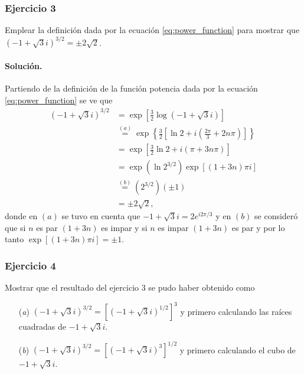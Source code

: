 \documentclass[a4paper]{report}
\begin{document}
\subsubsection{Ejercicio 3}

Emplear la definición dada por la ecuación \ref{eq:power_function} para mostrar que \((-1+\sqrt{3}i)^{3/2}=\pm2\sqrt{2}\).

\paragraph{Solución.} Partiendo de la definición de la función potencia dada por la ecuación \ref{eq:power_function} se ve que 
\begin{align*}
 (-1+\sqrt{3}i)^{3/2}&=\exp\left[\frac{3}{2}\log(-1+\sqrt{3}i)\right]\\
  &\overset{(a)}{=}\exp\left\{\frac{3}{2}\left[\ln2+i\left(\frac{2\pi}{3}+2n\pi\right)\right]\right\}\\
  &=\exp\left[\frac{3}{2}\ln2+i\left(\pi+3n\pi\right)\right]\\
  &=\exp\left(\ln2^{3/2}\right)\exp\left[\left(1+3n\right)\pi i\right]\\
  &\overset{(b)}{=}(2^{3/2})(\pm1)\\
  &=\pm2\sqrt{2},
\end{align*}
donde en \((a)\) se tuvo en cuenta que \(-1+\sqrt{3}i=2e^{i2\pi/3}\) y en \((b)\) se consideró que si \(n\) es par \((1+3n)\) es impar y si \(n\) es impar \((1+3n)\) es par y por lo tanto \(\exp[(1+3n)\pi i]=\pm1\).

\subsubsection{Ejercicio 4}

Mostrar que el resultado del ejercicio 3 se pudo haber obtenido como
\begin{enumerate}
 \item[(\textit{a})] \((-1+\sqrt{3}i)^{3/2}=[(-1+\sqrt{3}i)^{1/2}]^3\) y primero calculando las raíces cuadradas de \(-1+\sqrt{3}i\).
 \item[(\textit{b})] \((-1+\sqrt{3}i)^{3/2}=[(-1+\sqrt{3}i)^3]^{1/2}\) y primero calculando el cubo de \(-1+\sqrt{3}i\).
\end{enumerate}
\end{document}
